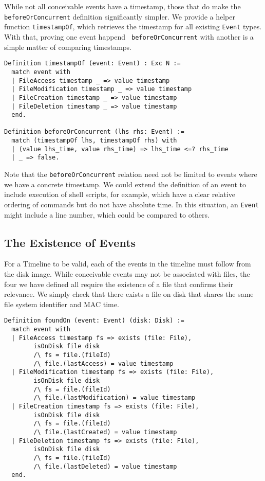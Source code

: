\documentclass[nocopyrightspace,preprint]{sigplanconf}
\begin{document}
While not all conceivable events have a timestamp, those that do make the {\tt
beforeOrConcurrent} definition significantly simpler. We provide a helper
function {\tt timestampOf}, which retrieves the timestamp for all existing
{\tt Event} types. With that, proving one event happend {\tt
beforeOrConcurrent} with another is a simple matter of comparing timestamps.

\begin{lstlisting}
Definition timestampOf (event: Event) : Exc N :=
  match event with
  | FileAccess timestamp _ => value timestamp
  | FileModification timestamp _ => value timestamp
  | FileCreation timestamp _ => value timestamp
  | FileDeletion timestamp _ => value timestamp
  end.

Definition beforeOrConcurrent (lhs rhs: Event) :=
  match (timestampOf lhs, timestampOf rhs) with
  | (value lhs_time, value rhs_time) => lhs_time <=? rhs_time
  | _ => false.
\end{lstlisting}

Note that the {\tt beforeOrConcurrent} relation need not be limited to events
where we have a concrete timestamp. We could extend the definition of an event
to include execution of shell scripts, for example, which have a clear
relative ordering of commands but do not have absolute time. In this
situation, an {\tt Event} might include a line number, which could be compared
to others.

\subsection{The Existence of Events}

For a Timeline to be valid, each of the events in the timeline must follow
from the disk image. While conceivable events may not be associated with
files, the four we have defined all require the existence of a file that
confirms their relevance. We simply check that there exists a file on disk
that shares the same file system identifier and MAC time.

\begin{lstlisting}
Definition foundOn (event: Event) (disk: Disk) :=
  match event with
  | FileAccess timestamp fs => exists (file: File),
        isOnDisk file disk
        /\ fs = file.(fileId)
        /\ file.(lastAccess) = value timestamp
  | FileModification timestamp fs => exists (file: File),
        isOnDisk file disk
        /\ fs = file.(fileId)
        /\ file.(lastModification) = value timestamp
  | FileCreation timestamp fs => exists (file: File),
        isOnDisk file disk
        /\ fs = file.(fileId)
        /\ file.(lastCreated) = value timestamp
  | FileDeletion timestamp fs => exists (file: File),
        isOnDisk file disk
        /\ fs = file.(fileId)
        /\ file.(lastDeleted) = value timestamp
  end.
\end{lstlisting}
\end{document}
